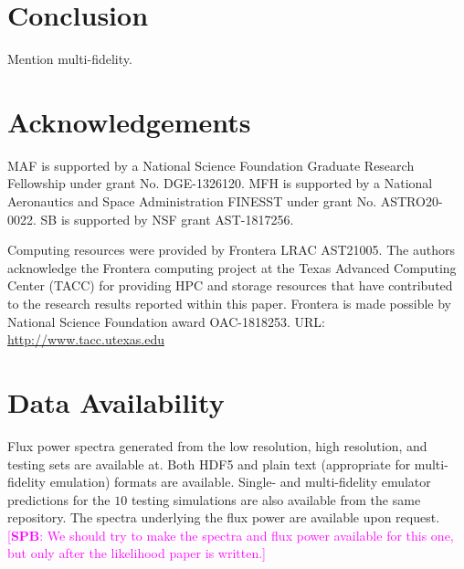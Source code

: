 \documentclass[a4paper,11pt]{article}
\newcommand{\spb}[1]{{\textcolor{magenta}{[{\bf SPB}: #1]}}}
\begin{document}
\section{Conclusion}

Mention multi-fidelity.

\section*{Acknowledgements}
MAF is supported by a National Science Foundation Graduate Research Fellowship under grant No. DGE-1326120.
MFH is supported by a National Aeronautics and Space Administration FINESST under grant No. ASTRO20-0022.
SB is supported by NSF grant AST-1817256.

Computing resources were provided by Frontera LRAC AST21005.
The authors acknowledge the Frontera computing project at the Texas Advanced Computing Center (TACC) for providing HPC and storage resources that have contributed to the research results reported within this paper.
Frontera is made possible by National Science Foundation award OAC-1818253.
URL: \url{http://www.tacc.utexas.edu}

\section*{Data Availability}
Flux power spectra generated from the low resolution, high resolution, and testing sets are available at.
Both HDF5 and plain text (appropriate for multi-fidelity emulation) formats are available.
Single- and multi-fidelity emulator predictions for the $10$ testing simulations are also available from the same repository.
The spectra underlying the flux power are available upon request.
\spb{We should try to make the spectra and flux power available for this one, but only after the likelihood paper is written.}




\appendix

\label{lastpage}
\end{document}
